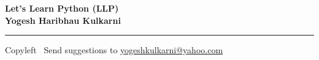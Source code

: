 
\graphicspath{{images/}}

\footnotesize


\begin{center}
\Large{\textbf{Let's Learn Python (LLP)\\ Yogesh Haribhau Kulkarni}}  
\end{center}

\begin{multicols}{2}

\end{multicols}

\rule{\linewidth}{0.25pt}
\scriptsize
Copyleft \textcopyleft\  Send suggestions to 
\href{http://www.yogeshkulkarni.com}{yogeshkulkarni@yahoo.com}


